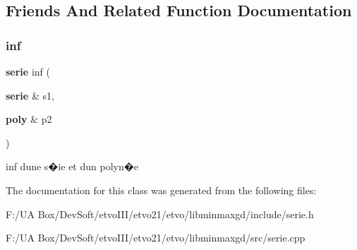 \subsection{Friends And Related Function Documentation}
\mbox{\label{classmmgd_1_1serie_ae529c9c97ff0829cde0be6b234952d67}} 
\subsubsection{inf}
{\footnotesize\ttfamily \textbf{ serie} inf (\begin{DoxyParamCaption}\item[{\textbf{ serie} \&}]{s1,  }\item[{\textbf{ poly} \&}]{p2 }\end{DoxyParamCaption})\hspace{0.3cm}{\ttfamily [friend]}}

inf d\textquotesingle{}une s�ie et d\textquotesingle{}un polyn�e 

The documentation for this class was generated from the following files\+:\begin{DoxyCompactItemize}
\item 
F\+:/\+U\+A Box/\+Dev\+Soft/etvo\+I\+I\+I/etvo21/etvo/libminmaxgd/include/serie.\+h\item 
F\+:/\+U\+A Box/\+Dev\+Soft/etvo\+I\+I\+I/etvo21/etvo/libminmaxgd/src/serie.\+cpp\end{DoxyCompactItemize}
